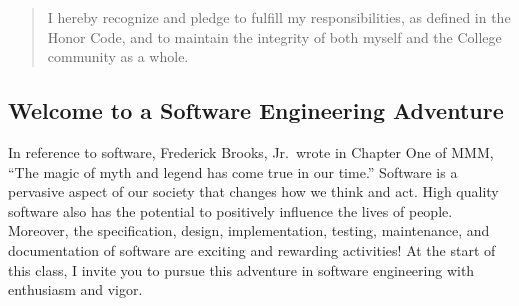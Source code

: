 \vspace*{-.1in}
\begin{quote}
I hereby recognize and pledge to fulfill my responsibilities, as defined in the Honor Code, and to maintain the
integrity of both myself and the College community as a whole.  
\end{quote}
\vspace*{-.15in}

\subsection*{Welcome to a Software Engineering Adventure}

In reference to software, Frederick Brooks, Jr.\ wrote in Chapter One of MMM, ``The magic of myth and legend has come true
in our time.'' Software is a pervasive aspect of our society that changes how we think and act.  High quality software
also has the potential to positively influence the lives of people. Moreover, the specification, design, implementation,
testing, maintenance, and documentation of software are exciting and rewarding activities!  At the start of this class,
I invite you to pursue this adventure in software engineering with enthusiasm and vigor.


